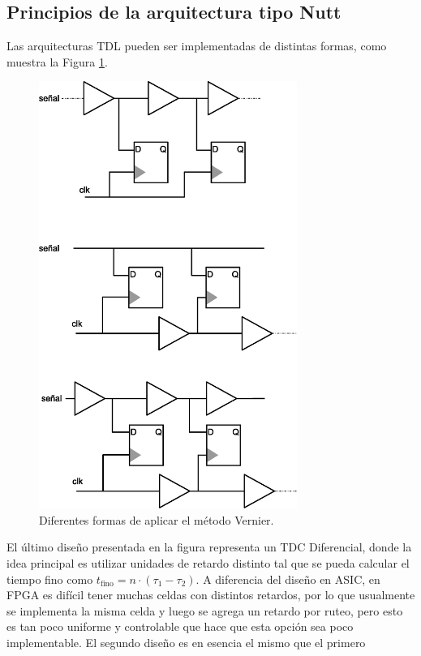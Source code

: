\subsection{Principios de la arquitectura tipo Nutt}
Las arquitecturas TDL pueden ser implementadas de distintas formas, como muestra la Figura \ref{fig: various_tdl}.
\begin{figure}[H]
     \centering
     \includegraphics[width=0.75\textwidth]{imagenes/various_tdl.eps}
     \caption{Diferentes formas de aplicar el método Vernier.}
     \label{fig: various_tdl}
\end{figure}
El último diseño presentada en la figura representa un TDC Diferencial, donde la
idea principal es utilizar unidades de retardo distinto tal que se pueda calcular
el tiempo fino como $t_\text{fino} = n \cdot (\tau_1 - \tau_2)$. A diferencia 
del diseño en ASIC, en FPGA es difícil
tener muchas celdas con distintos retardos, por lo que usualmente se implementa la misma celda
y luego se agrega un retardo por ruteo, pero esto es tan poco uniforme y controlable que 
hace que esta opción sea poco implementable. El segundo diseño es en esencia el mismo que el primero
